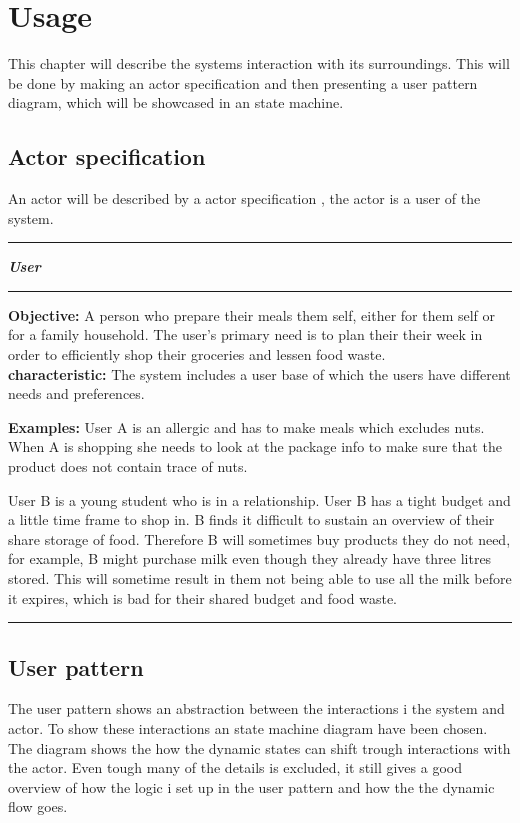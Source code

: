\chapter{Usage}\label{Usage}
This chapter will describe the systems interaction with its surroundings. This will be done by making an actor specification and then presenting a user pattern diagram, which will be showcased in an state machine.

\section{Actor specification}
\label{Actor_specification}
An actor will be described by a actor specification , the actor is a user of the system.

\hrule
\begin{tightcenter}
\textit{\textbf{User}}
\end{tightcenter}
\hrule
\textbf{Objective:} A person who prepare their meals them self, either for them self or for a family household. The user's primary need is to plan their their week in order to efficiently shop their groceries and lessen food waste.\\

\textbf{characteristic:} The system includes a user base of which the users have different needs and preferences.

\textbf{Examples:} User A is an allergic and has to make meals which excludes nuts. When A is shopping she needs to look at the package info to make sure that the product does not contain trace of nuts.

User B is a young student who is in a relationship. User B has a tight budget and a little time frame to shop in. B finds it difficult to sustain an overview of their share storage of food. Therefore B will sometimes buy products they do not need, for example, B might purchase milk even though they already have three litres stored. This will sometime result in them not being able to use all the milk before it expires, which is bad for their shared budget and food waste.
\hrule



\section{User pattern}
The user pattern shows an abstraction between the interactions i the system and actor. To show these interactions an state machine diagram have been chosen. The diagram shows the how the dynamic states can shift trough interactions with the actor. Even tough many of the details is excluded, it still gives a good overview of how the logic i set up in the user pattern and how the the dynamic flow goes. 

